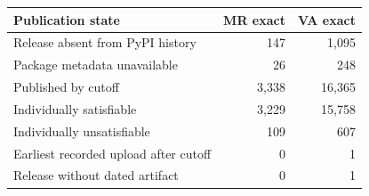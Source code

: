 \begin{tableorg}[!htbp]
\centering\small
\renewcommand{\tablecaptionfont}{\fontsize{9}{11}\selectfont}
\caption{Publication states of active, identified exact declarations ($k=e$) in clean \myso.
Counts are declaration occurrences, including repeated advice for the same release.
Indented rows partition releases published by the cutoff according to individual satisfiability under $\kappa$.}
\label{tab:release_states}
\setlength{\tabcolsep}{4pt}
\renewcommand{\arraystretch}{1.15}
\begin{tabular}{@{}lrr@{}}
\toprule
\textbf{Publication state} & \textbf{MR exact} & \textbf{VA exact} \\
\midrule
Release absent from PyPI history & 147 & 1,095 \\
Package metadata unavailable & 26 & 248 \\
Published by cutoff & 3,338 & 16,365 \\
\quad Individually satisfiable & 3,229 & 15,758 \\
\quad Individually unsatisfiable & 109 & 607 \\
Earliest recorded upload after cutoff & 0 & 1 \\
Release without dated artifact & 0 & 1 \\
\bottomrule
\end{tabular}
\end{tableorg}

